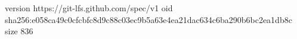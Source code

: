 version https://git-lfs.github.com/spec/v1
oid sha256:e058ca49c0cfcbfc8d9c88c03ec9b5a63e4ea21dac634c6ba290b6bc2ea1db8c
size 836
